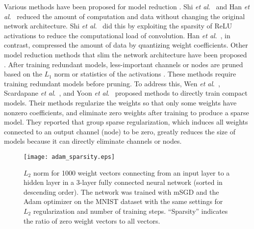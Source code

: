 \documentclass[conference]{IEEEtran}
\newcommand{\etal}{\textit{et al}.}
\begin{document}
Various methods have been proposed for model reduction \cite{Shi_2017,Han_2016,Li_2017,Polyak_2015,Wen_2016,Scardapane_2017,Yoon_2017}. 
Shi \etal~\cite{Shi_2017} and Han \etal~\cite{Han_2016} reduced the amount of computation and data without changing the original network architecture. 
Shi \etal~\cite{Shi_2017} did this by exploiting the sparsity of ReLU activations to reduce the computational load of convolution. 
Han \etal~\cite{Han_2016}, in contrast, compressed the amount of data by quantizing weight coefficients. 
Other model reduction methods that slim the network architecture have been proposed \cite{Li_2017,Polyak_2015,Wen_2016,Scardapane_2017}. 
After training redundant models, less-important channels or nodes are pruned based on the $L_1$ norm \cite{Li_2017} or statistics of the activations \cite{Polyak_2015}. 
These methods require training redundant models before pruning. To address this, Wen \etal~\cite{Wen_2016}, Scardapane \etal~\cite{Scardapane_2017}, and Yoon \etal~\cite{Yoon_2017} proposed methods to directly train compact models. 
Their methods regularize the weights so that only some weights have nonzero coefficients, and eliminate zero weights after training to produce a sparse model. 
They reported that group sparse regularization, which induces all weights connected to an output channel (node) to be zero, 
greatly reduces the size of models because it can directly eliminate channels or nodes. 

\begin{figure*}[tb]
	\centerline{\texttt{[image: adam\_sparsity.eps]}}
	\caption{
		$L_2$ norm for 1000 weight vectors connecting from an input layer to a hidden layer in a 3-layer fully connected neural network (sorted in descending order). 
		The network was trained with mSGD and the Adam optimizer on the MNIST dataset with the same settings for $L_2$ regularization and number of training steps. ``Sparsity'' indicates the ratio of zero weight vectors to all vectors.
	}
	\label{fig:adam_sparsity}
\end{figure*}
\end{document}
